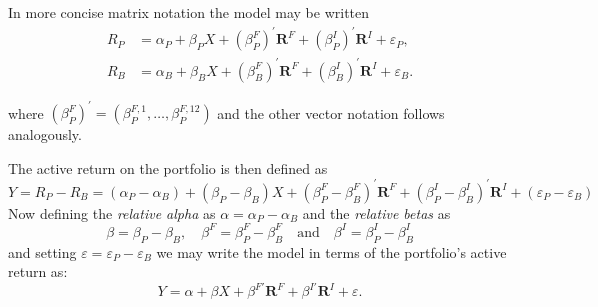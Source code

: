 In more concise matrix notation the model may be written
\begin{align*}
R_P &= \alpha_P + \beta_P X + (\beta_P^F)^{\prime} \mathbf{R}^F + (\beta_P^I)^{\prime} \mathbf{R}^I + \varepsilon_P,
\\
R_B &= \alpha_B + \beta_B X + (\beta_B^F)^{\prime} \mathbf{R}^F + (\beta_B^I)^{\prime} \mathbf{R}^I + \varepsilon_B.
\end{align*}

where $(\beta_P^F)^{\prime} = (\beta_P^{F,1}, \ldots, \beta_P^{F,12})$ and the other vector notation follows analogously.

The active return on the portfolio is then defined as 
$$
Y = R_P - R_B = (\alpha_P - \alpha_B) + (\beta_P - \beta_B) X + (\beta_P^F - \beta_B^F)^{\prime} \mathbf{R}^F + (\beta_P^I - \beta_B^I)^{\prime} \mathbf{R}^I + (\varepsilon_P - \varepsilon_B)
$$
Now defining the \textit{relative alpha} as $\alpha = \alpha_P - \alpha_B$ and the \textit{relative betas} as
$$
\beta = \beta_P - \beta_B, \quad \beta^F = \beta_P^F - \beta_B^F \quad \text{and} \quad \beta^I = \beta_P^I - \beta_B^I
$$
and setting $\varepsilon = \varepsilon_P - \varepsilon_B$ we may write the model in terms of the portfolio's active return as:
$$
Y = \alpha + \beta X + \beta^{F\prime}\mathbf{R}^F + \beta^{I\prime}\mathbf{R}^I + \varepsilon.
$$


